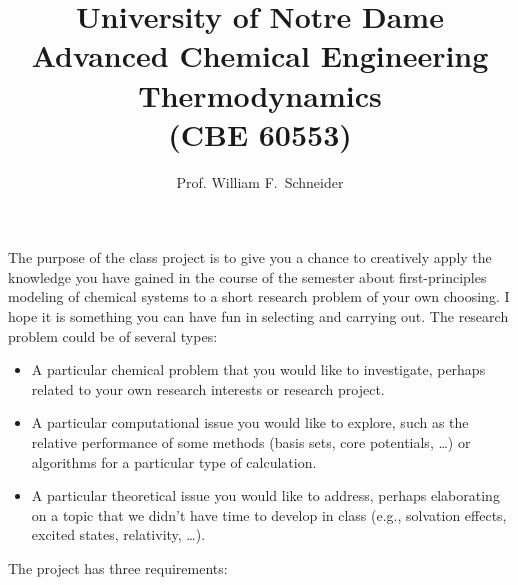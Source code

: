 \documentclass[11pt]{article}
\title{University of Notre Dame\\Advanced Chemical Engineering Thermodynamics\\(CBE 60553)}
\author{Prof. William F.\ Schneider}
\begin{document}
\noindent The purpose of the class project is to give you a chance to creatively apply the knowledge you have gained in the course of the semester about first-principles modeling of chemical systems to a short research problem of your own choosing. I hope it is something you can have fun in selecting and carrying out. The research problem could be of several types:

\begin{itemize}
\item A particular chemical problem that you would like to investigate, perhaps related to your own research interests or research project.
\item A particular computational issue you would like to explore, such as the relative performance of some methods (basis sets, core potentials, \ldots) or algorithms for a particular type of calculation.
\item A particular theoretical issue you would like to address, perhaps elaborating on a topic that we didn’t have time to develop in class (e.g., solvation effects, excited states, relativity, \ldots).
\end{itemize}

The project has three requirements:
\end{document}
